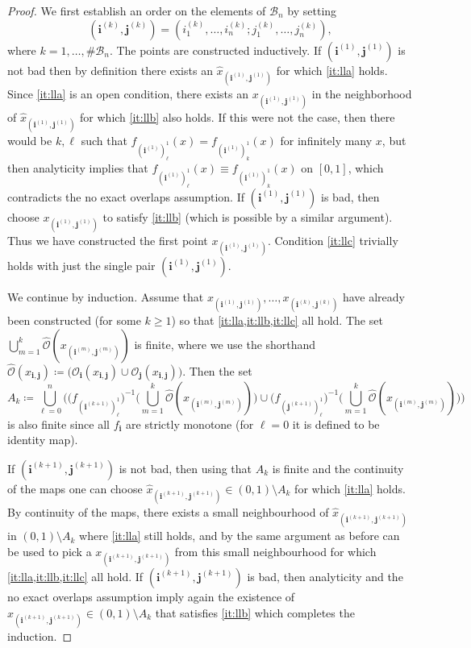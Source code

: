 \documentclass[11pt,]{article}
\def\cref#1{\ref{#1}}%
\theoremstyle{definition}
\theoremstyle{remark}
\newcommand{\0}{\mathbf{0}}
\newcommand{\bi}{\mathbf{i}}
\newcommand{\bj}{\mathbf{j}}
\numberwithin{equation}{section}
\begin{document}
\begin{proof}
We first establish an order on the elements of $\mathcal{B}_n$ by setting
\[
  (\bi^{(k)},\bj^{(k)})=(i_1^{(k)},\ldots,
i_n^{(k)};j_1^{(k)},\ldots,j_n^{(k)}),
\]
where $k=1,\ldots,\#\mathcal{B}_n$. The points are constructed
inductively. If $(\bi^{(1)},\bj^{(1)})$ is not bad then by definition there exists an $\hat
x_{(\bi^{(1)},\bj^{(1)})}$ for which \cref{it:lla} holds. Since \cref{it:lla} is an open condition, there exists an
$x_{(\bi^{(1)},\bj^{(1)})}$ in the neighborhood of $\hat x_{(\bi^{(1)},\bj^{(1)})}$ for which \cref{it:llb}
also holds. If this were not the case, then there would be $k,\ell$ such that
$f_{(\bi^{(1)})_{\ell}^1}(x)=f_{(\bi^{(1)})_{k}^1}(x)$ for infinitely many $x$, but then analyticity
implies that $f_{(\bi^{(1)})_{\ell}^1}(x)\equiv f_{(\bi^{(1)})_{k}^1}(x)$ on $[0,1]$, which contradicts the no
exact overlaps assumption. If $(\bi^{(1)},\bj^{(1)})$ is bad, then choose
$x_{(\bi^{(1)},\bj^{(1)})}$ to satisfy \cref{it:llb} (which is possible by a similar argument). Thus we have
constructed the first point $x_{(\bi^{(1)},\bj^{(1)})}$. Condition \cref{it:llc} trivially holds with just
the single pair $(\bi^{(1)},\bj^{(1)})$. 

We continue by induction. Assume that $x_{(\bi^{(1)},\bj^{(1)})},\ldots,x_{(\bi^{(k)},\bj^{(k)})}$
have already been constructed (for some $k\geq 1$) so that \cref{it:lla,it:llb,it:llc} all hold. The set
$\bigcup_{m=1}^k \widehat{\mathcal{O}}(x_{(\bi^{(m)},\bj^{(m)})})$ is finite, where we use the
shorthand  $\widehat{\mathcal{O}}(x_{\bi,\bj})\coloneqq\big(\mathcal{O}_{\bi}(x_{\bi,\bj})\cup
\mathcal{O}_{\bj}(x_{\bi,\bj})\big)$. Then the set
\begin{equation*}
A_k\coloneqq \bigcup_{\ell=0}^n \bigg( \big(f_{(\bi^{(k+1)})_{\ell}^1}\big)^{-1} \Big(
\bigcup_{m=1}^k \widehat{\mathcal{O}}(x_{(\bi^{(m)},\bj^{(m)})}) \Big) \cup
\big(f_{(\bj^{(k+1)})_{\ell}^1}\big)^{-1} \Big( \bigcup_{m=1}^k
\widehat{\mathcal{O}}(x_{(\bi^{(m)},\bj^{(m)})}) \Big) \bigg)
\end{equation*}
is also finite since all $f_{\bi}$ are strictly monotone (for $\ell=0$ it is defined to be identity map). 

If $(\bi^{(k+1)},\bj^{(k+1)})$ is not
bad, then using that $A_k$ is finite and the continuity of the maps one can choose $\hat
x_{(\bi^{(k+1)},\bj^{(k+1)})}\in(0,1)\setminus A_k$ for which \cref{it:lla}
holds. By continuity of the maps, there exists a small neighbourhood of $\hat
x_{(\bi^{(k+1)},\bj^{(k+1)})}$ in $(0,1)\setminus A_k$ where \cref{it:lla} still holds, and by the same
argument as before can be used to pick a $x_{(\bi^{(k+1)},\bj^{(k+1)})}$ from this small
neighbourhood for which \cref{it:lla,it:llb,it:llc} all hold. If $(\bi^{(k+1)},\bj^{(k+1)})$ is bad, then
analyticity and the no exact overlaps assumption imply again the existence of
$x_{(\bi^{(k+1)},\bj^{(k+1)})}\in(0,1)\setminus A_k$ that satisfies \cref{it:llb} which completes the
induction. 
\end{proof}
\end{document}
